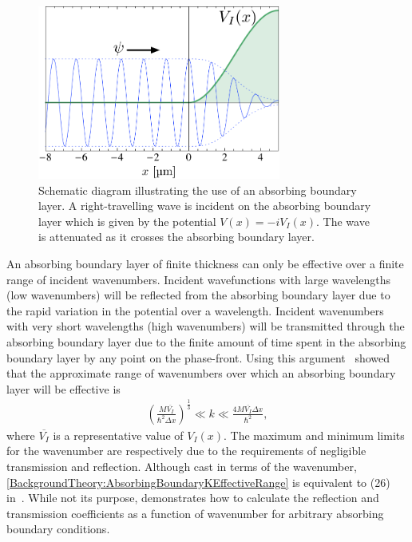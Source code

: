 \begin{figure}
    \centering
    \includegraphics[width=8cm]{AbsorbingBoundarySchematic}
    \caption{
        \label{BackgroundTheory:AbsorbingBoundarySchematic}
        Schematic diagram illustrating the use of an absorbing boundary layer. A right-travelling wave is incident on the absorbing boundary layer which is given by the potential $V(x) = -i V_I(x)$. The wave is attenuated as it crosses the absorbing boundary layer.
    }
\end{figure}

An absorbing boundary layer of finite thickness can only be effective over a finite range of incident wavenumbers. Incident wavefunctions with large wavelengths (low wavenumbers) will be reflected from the absorbing boundary layer due to the rapid variation in the potential over a wavelength. Incident wavenumbers with very short wavelengths (high wavenumbers) will be transmitted through the absorbing boundary layer due to the finite amount of time spent in the absorbing boundary layer by any point on the phase-front.  Using this argument~\citet{Neuhasuer:1989} showed that the approximate range of wavenumbers over which an absorbing boundary layer will be effective is
\begin{align}
    \label{BackgroundTheory:AbsorbingBoundaryKEffectiveRange}
    \left( \frac{M \overline{V_I}}{\hbar^2 \Delta x}\right)^{\frac{1}{3}} \ll k \ll \frac{4 M \overline{V_I} \Delta x}{\hbar^2},
\end{align}
where $\overline{V_I}$ is a representative value of $V_I(x)$. The maximum and minimum limits for the wavenumber are respectively due to the requirements of negligible transmission and reflection. Although cast in terms of the wavenumber, \eqref{BackgroundTheory:AbsorbingBoundaryKEffectiveRange} is equivalent to (26) in~\citep{Neuhasuer:1989}. While not its purpose,  demonstrates how to calculate the reflection and transmission coefficients as a function of wavenumber for arbitrary absorbing boundary conditions.

